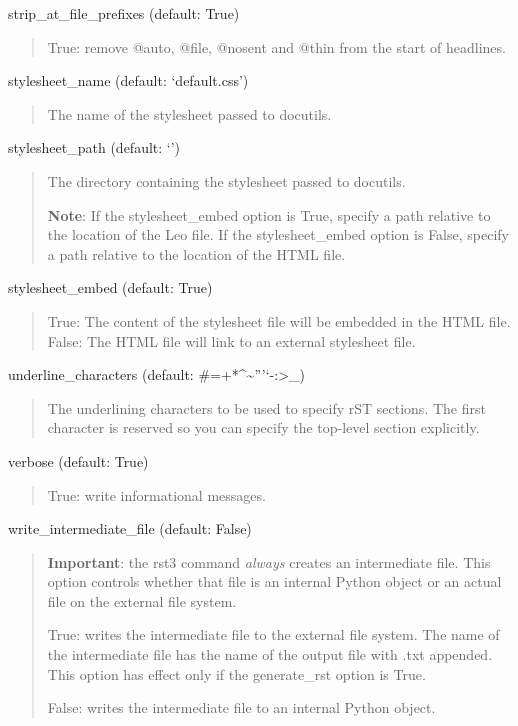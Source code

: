 \documentclass[a4paper,10pt,english]{sphinxmanual}
\begin{document}
strip\_at\_file\_prefixes (default: True)
\begin{quote}

True: remove @auto, @file, @nosent and @thin from the start of headlines.
\end{quote}

stylesheet\_name (default: `default.css')
\begin{quote}

The name of the stylesheet passed to docutils.
\end{quote}

stylesheet\_path (default: `')
\begin{quote}

The directory containing the stylesheet passed to docutils.

\textbf{Note}: If the stylesheet\_embed option is True, specify a path relative to
the location of the Leo file. If the stylesheet\_embed option is False,
specify a path relative to the location of the HTML file.
\end{quote}

stylesheet\_embed (default: True)
\begin{quote}

True: The content of the stylesheet file will be embedded in the HTML file.
False: The HTML file will link to an external stylesheet file.
\end{quote}

underline\_characters (default: \#=+*\textasciicircum{}\textasciitilde{}'''{}`-:\textgreater{}\_)
\begin{quote}

The underlining characters to be used to specify rST sections.
The first character is reserved so you can specify the top-level section explicitly.
\end{quote}

verbose (default: True)
\begin{quote}

True: write informational messages.
\end{quote}

write\_intermediate\_file (default: False)
\begin{quote}

\textbf{Important}: the rst3 command \emph{always} creates an intermediate file.
This option controls whether that file is an internal Python object
or an actual file on the external file system.

True: writes the intermediate file to the external file system. The name of
the intermediate file has the name of the output file with .txt appended.
This option has effect only if the generate\_rst option is True.

False: writes the intermediate file to an internal Python object.
\end{quote}
\end{document}
